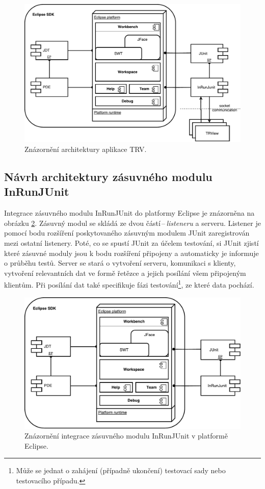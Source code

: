   \begin{figure}[!h]
    \includegraphics[width=\textwidth, center]{obrazky-figures/TRV_architecture.pdf}
    \caption{Znázornění architektury aplikace TRV.}
    \label{fig:TRV_architecture}
  \end{figure}

    \subsection{Návrh architektury zásuvného modulu InRunJUnit}
    Integrace zásuvného modulu InRunJUnit do platformy Eclipse je znázorněna na obrázku \ref{fig:inrunjunit_eclipse_integration}. Zásuvný modul se skládá ze dvou částí\,--\,\emph{listeneru} a serveru. Listener je pomocí bodu rozšíření poskytovaného zásuvným modulem JUnit zaregistrován mezi ostatní listenery. Poté, co se spustí JUnit za účelem testování, si JUnit zjistí které zásuvné moduly jsou k bodu rozšíření připojeny a automaticky je informuje o průběhu testů. Server se stará o vytvoření serveru, komunikaci s klienty, vytvoření relevantních dat ve formě řetězce a jejich posílání všem připojeným klientům. Při posílání dat také specifikuje fázi testování\footnote{Může se jednat o zahájení (případně ukončení) testovací sady nebo testovacího případu.}, ze které data pochází.

      \begin{figure}[!h]
	\includegraphics[width=\textwidth, center]{obrazky-figures/inrunjunit_eclipse_integration.pdf}
	\caption{Znázornění integrace zásuvného modulu InRunJUnit v platformě Eclipse.}
	\label{fig:inrunjunit_eclipse_integration}
      \end{figure}

